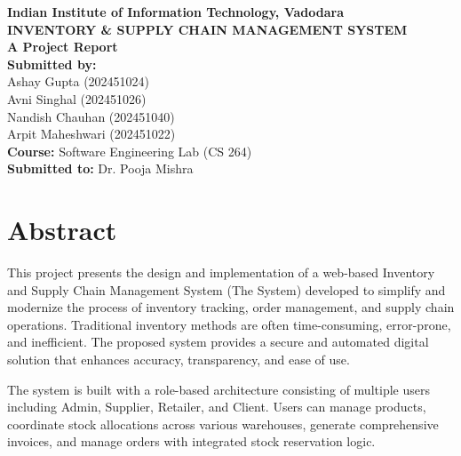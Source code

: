 \documentclass[12pt,a4paper]{report}
\begin{document}
\begin{titlepage}
\begin{center}
    \vspace*{1.5cm}
    
    {\fontsize{20}{24}\selectfont \textbf{Indian Institute of Information Technology, Vadodara}}\\[2cm]
    
    {\fontsize{24}{28}\selectfont \textbf{INVENTORY \& SUPPLY CHAIN MANAGEMENT SYSTEM}}\\[2cm]
    
    {\Large \textbf{A Project Report}}\\[3cm]
    
    {\large \textbf{Submitted by:}}\\[0.5cm]
    {\large Ashay Gupta (202451024)}\\[0.2cm]
    {\large Avni Singhal (202451026)}\\[0.2cm]
    {\large Nandish Chauhan (202451040)}\\[0.2cm]
    {\large Arpit Maheshwari (202451022)}\\[3cm]
    
    {\large \textbf{Course: }Software Engineering Lab (CS 264)}\\[0.5cm]
    
    {\large \textbf{Submitted to: }Dr. Pooja Mishra}\\[2cm]
    
\end{center}
\end{titlepage}


\chapter*{Abstract}
This project presents the design and implementation of a web-based Inventory and Supply Chain Management System (The System) developed to simplify and modernize the process of inventory tracking, order management, and supply chain operations. Traditional inventory methods are often time-consuming, error-prone, and inefficient. The proposed system provides a secure and automated digital solution that enhances accuracy, transparency, and ease of use.

The system is built with a role-based architecture consisting of multiple users including Admin, Supplier, Retailer, and Client. Users can manage products, coordinate stock allocations across various warehouses, generate comprehensive invoices, and manage orders with integrated stock reservation logic. 
\end{document}
